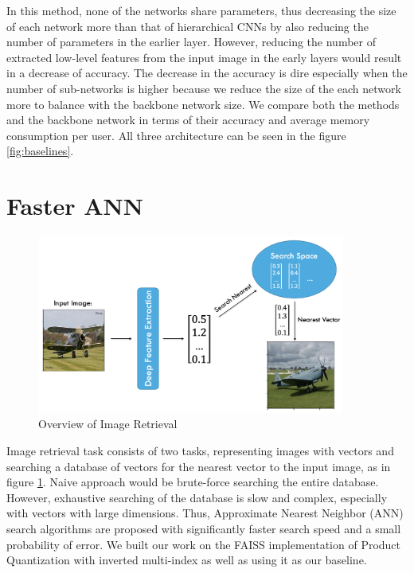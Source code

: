 In this method, none of the networks share parameters, thus decreasing the size of each network more than that of hierarchical CNNs by also reducing the number of parameters in the earlier layer. 
However, reducing the number of extracted low-level features from the input image in the early layers would result in a decrease of accuracy. 
The decrease in the accuracy is dire especially when the number of sub-networks is higher because we reduce the size of the each network more to balance with the backbone network size. 
We compare both the methods and the backbone network in terms of their accuracy and average memory consumption per user. 
All three architecture can be seen in the figure \ref{fig:baselines}.


\section{Faster ANN}
\label{sec:FasterANN}

\begin{figure}
    \centering
    \includegraphics[width=0.9\textwidth]{thesis/images/image_ret_exp-fig.png}
    \caption{Overview of Image Retrieval}
    \label{fig:ret-exp}
\end{figure}

Image retrieval task consists of two tasks, representing images with vectors and searching a database of vectors for the nearest vector to the input image, as in figure \ref{fig:ret-exp}. 
Naive approach would be brute-force searching the entire database.
However, exhaustive searching of the database is slow and complex, especially with vectors with large dimensions. 
Thus, Approximate Nearest Neighbor (ANN) search algorithms are proposed with significantly faster search speed and a small probability of error. 
We built our work on the FAISS implementation\cite{faiss} of Product Quantization\cite{jegou2010product} with inverted multi-index as well as using it as our baseline.

